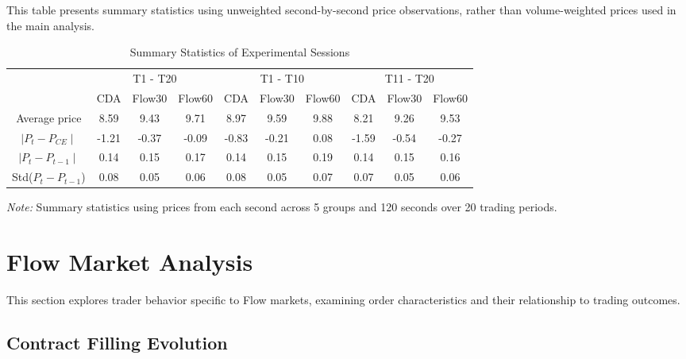 This table presents summary statistics using unweighted second-by-second price observations, rather than volume-weighted prices used in the main analysis.

\begin{table}[H]
    \centering
    \caption{Summary Statistics of Experimental Sessions}
    \begin{threeparttable}
    \begin{tabular}{cccccccccc}
    \toprule
     & \multicolumn{3}{c}{T1 - T20} & \multicolumn{3}{c}{T1 - T10}  & \multicolumn{3}{c}{T11 - T20}  \\
     & CDA          & Flow30          & Flow60          & CDA           & Flow30          & Flow60          & CDA        & Flow30          & Flow60           \\
    \midrule
    Average price & 8.59 & 9.43 & 9.71 & 8.97 & 9.59 & 9.88 & 8.21 & 9.26 & 9.53 \\
    $\mid P_t - P_{CE} \mid$ & -1.21 & -0.37 & -0.09 & -0.83 & -0.21 & 0.08 & -1.59 & -0.54 & -0.27 \\
    $\mid P_{t} - P_{t - 1} \mid$ & 0.14 & 0.15 & 0.17 & 0.14 & 0.15 & 0.19 & 0.14 & 0.15 & 0.16 \\
    Std($P_{t} - P_{t - 1}$) & 0.08 & 0.05 & 0.06 & 0.08 & 0.05 & 0.07 & 0.07 & 0.05 & 0.06 \\
    \bottomrule
    \end{tabular}
    \begin{tablenotes}
    \item \small \textit{Note:} Summary statistics using prices from each second across 5 groups and 120 seconds over 20 trading periods.
    \end{tablenotes}
    \end{threeparttable}
    \label{tab:summary_stat_raw}
\end{table}

\newpage

\section{Flow Market Analysis}

This section explores trader behavior specific to Flow markets, examining order characteristics and their relationship to trading outcomes.

\subsection{Contract Filling Evolution}

